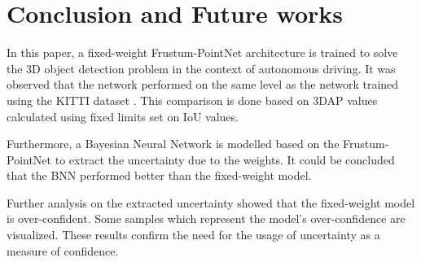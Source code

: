 \documentclass[10pt,twocolumn,letterpaper]{article}
\begin{document}
\section{Conclusion and Future works}
In this paper, a fixed-weight Frustum-PointNet \cite{FPointnet2018} architecture is trained to solve the 3D object detection problem in the context of autonomous driving. It was observed that the network performed on the same level as the network trained using the KITTI dataset \cite{KITTI2012}. This comparison is done based on 3DAP values calculated using fixed limits set on IoU values.
    
Furthermore, a Bayesian Neural Network is modelled based on the Frustum-PointNet \cite{FPointnet2018} to extract the uncertainty due to the weights. It could be concluded that the BNN performed better than the fixed-weight model.

Further analysis on the extracted uncertainty showed that the fixed-weight model is over-confident. Some samples which represent the model's over-confidence are visualized. These results confirm the need for the usage of uncertainty as a measure of confidence.


{\small


}
\end{document}

